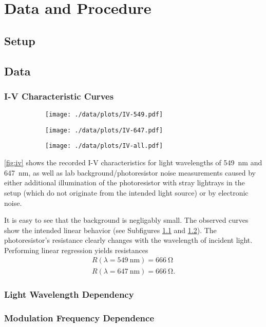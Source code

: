 \chapter{Data and Procedure}

\section{Setup}

\section{Data}

\subsection{I-V Characteristic Curves}
\begin{figure}
	\centering
	\begin{subfigure}{0.45\textwidth}
		\centering
		\texttt{[image: ./data/plots/IV-549.pdf]}
		\label{fig:iv-549}
	\end{subfigure}
	\begin{subfigure}{0.45\textwidth}
		\centering
		\texttt{[image: ./data/plots/IV-647.pdf]}
		\label{fig:iv-647}
	\end{subfigure}
  \par\bigskip
	\begin{subfigure}{0.7\textwidth}
		\centering
		\texttt{[image: ./data/plots/IV-all.pdf]}
		\label{fig:iv-all}
	\end{subfigure}
  \label{fig:iv}
\end{figure}

\autoref{fig:iv} shows the recorded I-V characteristics for light wavelengths of \SI{549}{\nm} and \SI{647}{\nm}, as well as lab background/photoresistor noise measurements caused by either additional illumination of the photoresistor with stray lightrays in the setup (which do not originate from the intended light source) or by electronic noise.

It is easy to see that the background is negligably small.
The observed curves show the intended linear behavior (see Subfigures \ref{fig:iv-549} and \ref{fig:iv-647}).
The photoresistor's resistance clearly changes with the wavelength of incident light.
Performing linear regression yields resistances
\begin{align*}
  R(\lambda = \SI{549}{\nm}) = \SI{666}{\ohm} \\
  R(\lambda = \SI{647}{\nm}) = \SI{666}{\ohm}.
\end{align*}

\subsection{Light Wavelength Dependency}

\subsection{Modulation Frequency Dependence}
